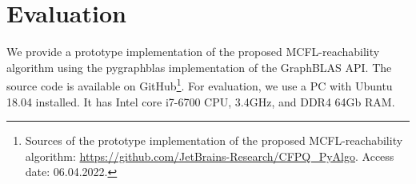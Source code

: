 \section{Evaluation}
We provide a prototype implementation of the proposed MCFL-reachability algorithm using the pygraphblas implementation of the GraphBLAS API. The source code is available on GitHub\footnote{Sources of the prototype implementation of the proposed MCFL-reachability algorithm: \url{https://github.com/JetBrains-Research/CFPQ\_PyAlgo}. Access date: 06.04.2022.}. For evaluation, we use a PC with Ubuntu 18.04 installed.
It has Intel core i7-6700 CPU, 3.4GHz, and DDR4 64Gb RAM.
	

	
	




